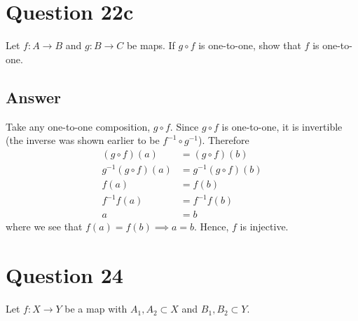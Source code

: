 \documentclass[
	12pt, %
]{fphw}
\newcommand\qed{\text{$\blacksquare$}}
\begin{document}

\section*{Question 22c}

\begin{problem}
Let  $f: A \to B$ and $g: B \to C$ be maps. If $g \circ f$ is one-to-one, show that $f$ is one-to-one.
\end{problem}


\subsection*{Answer}
Take any one-to-one composition, $g \circ f$. Since $g \circ f$ is one-to-one, it is invertible (the inverse was shown earlier to be $f^{-1} \circ g^{-1}$). Therefore
\begin{align*}
(g \circ f)(a) &= (g \circ f)(b)\\
g^{-1}(g \circ f)(a) &= g^{-1}(g \circ f)(b)\\
f(a) &= f(b)\\
 f^{-1}f(a)&=f^{-1}f(b)\\
a &= b
\end{align*}
where we see that $f(a)=f(b) \implies a=b$. Hence, $f$ is injective. \qed

\newpage

\section*{Question 24}

\begin{problem}
Let  $f: X \to Y$ be a map with $A_1, A_2 \subset X$ and $B_1, B_2 \subset Y$.
\end{problem}

\end{document}
